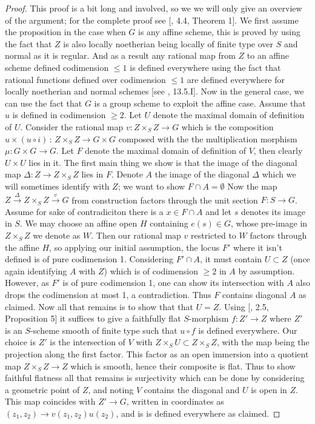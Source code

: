 \documentclass{article}
\theoremstyle{definition}
\theoremstyle{remark}
\theoremstyle{plain}
\newcommand{\ic}{\cap}
\begin{document}
\begin{proof}
	This proof is a bit long and involved, so we we will only give an overview of the argument; for the complete proof see [\cite{BLR}, 4.4, Theorem 1].
	We first assume the proposition in the case when $G$ is any affine scheme, this is proved by using the fact that $Z$ is also locally noetherian being locally of finite type over $S$ and normal as it is regular.
	And as a result any rational map from $Z$ to an affine scheme defined codimension $\leq 1$ is defined everywhere using the fact that rational functions defined over codimension $\leq 1$ are defined everywhere for locally noetherian and normal schemes [see \cite{FOAG}, 13.5.I]. \newline
	\indent Now in the general case, we can use the fact that $G$ is a group scheme to exploit the affine case.
	Assume that $u$ is defined in codimension $\geq 2$.
	Let $U$ denote the maximal domain of definition of $U$.
	Consider the rational map $v: Z \times_S Z \to G$ which is the composition $u \times (u \circ i)\,:\,Z \times_S  Z \to G \times G$ composed with the the multiplication morphism $\mu: G \times G \to G$.
	Let $F$ denote the maximal domain of definition of $V$, then clearly $U \times U$ lies in it.
	The first main thing we show is that the image of the diagonal map $\Delta: Z \to Z \times_S Z$ lies in $F$.
	Denote $A$ the image of the diagonal $\Delta$ which we will sometimes identify with $Z$; we want to show $F \ic A = \emptyset$
	Now the map $Z \xrightarrow{\Delta} Z \times_S Z \xrightarrow{v} G$ from construction factors through the unit section $F: S \to G$. 
	Assume for sake of contradiciton there is a $x \in F \ic A$ and let $s$ denotes its image in $S$.
	We may choose an affine open $H$ containing $e(s) \in G$, whose pre-image in $Z \times_S Z$ we denote as $W$.
	Then our rational map $v$ restricted to $W$ factors through the affine $H$, so applying our initial assumption, the locus $F'$ where it isn't defined is of pure codimension 1.
	Considering $F' \ic A$, it must contain $U \subset Z$ (once again identifying $A$ with $Z$) which is of codimension $\geq 2$ in $A$ by assumption.
	However, as $F'$ is of pure codimension 1, one can show its intersection with $A$ also drops the codimension at most 1, a contradiction.
	Thus $F$ contains diagonal $A$ as claimed. \newline
\indent Now all that remains is to show that that $U = Z$.
Using [\cite{BLR}, 2.5, Proposition 5] it suffices to give a faithfully flat $S$-morphism $f:Z' \to Z$ where $Z'$ is an $S$-scheme smooth of finite type such that $u \circ f$ is defined everywhere.
Our choice is $Z'$ is the intersection of $V$ with $Z \times_S U \subset Z \times_S Z$, with the map being the projection along the first factor.
This factor as an open immersion into a quotient map $Z \times_S Z \to Z$ which is smooth, hence their composite is flat.
Thus to show faithful flatness all that remains is surjectivity which can be done by considering a geometric point of $Z$, and noting $V$ contains the diagonal and $U$ is open in $Z$.
This map coincides with $Z' \to G$, written in coordinates as $(z_1, z_2) \to v(z_1, z_2)u(z_2)$, and is is defined everywhere as claimed.
\end{proof}
\end{document}
